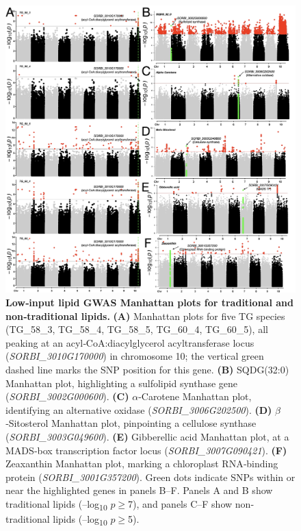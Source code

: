 \documentclass[10pt,letterpaper]{article}
\begin{document}
\begin{figure}[htbp]
  \centering
  \includegraphics[width=\textwidth]{fig/main/Fig3.png}
  \caption{\textbf{Low‐input lipid GWAS Manhattan plots for traditional and non‐traditional lipids.}
    \textbf{(A)} Manhattan plots for five TG species (TG\_58\_3, TG\_58\_4, TG\_58\_5, TG\_60\_4, TG\_60\_5), all peaking at an acyl‐CoA:diacylglycerol acyltransferase locus (\textit{SORBI\_3010G170000}) in chromosome 10; the vertical green dashed line marks the SNP position for this gene.  
    \textbf{(B)} SQDG(32:0) Manhattan plot, highlighting a sulfolipid synthase gene (\textit{SORBI\_3002G000600}).  
    \textbf{(C)} \(\alpha\)‐Carotene Manhattan plot, identifying an alternative oxidase (\textit{SORBI\_3006G202500}).  
    \textbf{(D)} \(\beta\)‐Sitosterol Manhattan plot, pinpointing a cellulose synthase (\textit{SORBI\_3003G049600}).  
    \textbf{(E)} Gibberellic acid Manhattan plot, at a MADS‐box transcription factor locus (\textit{SORBI\_3007G090421}).  
    \textbf{(F)} Zeaxanthin Manhattan plot, marking a chloroplast RNA‐binding protein (\textit{SORBI\_3001G357200}).  
    Green dots indicate SNPs within or near the highlighted genes in panels B–F. Panels A and B show traditional lipids (–log\textsubscript{10} $p$\(\geq\)7), and panels C–F show non‐traditional lipids (–log\textsubscript{10} $p$\(\geq\)5).}
  \label{fig:Fig3}
\end{figure}
\end{document}
